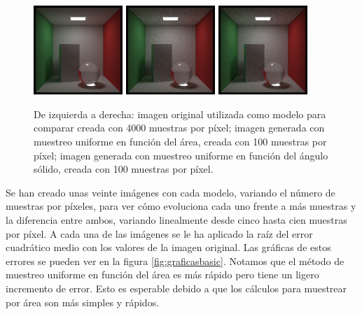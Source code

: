 \documentclass{scrbook}
\begin{document}
\begin{figure}[ht]
	\centering
	\includegraphics[width=0.3\textwidth]{original}
	\includegraphics[width=0.3\textwidth]{area_20}
	\includegraphics[width=0.3\textwidth]{solidangle2_20}
	
	\caption{De izquierda a derecha: imagen original utilizada como modelo para comparar creada con 4000 muestras por píxel; imagen generada con muestreo uniforme en función del área, creada con 100 muestras por píxel; imagen generada con muestreo uniforme en función del ángulo sólido,  creada con 100 muestras por píxel.}
	\label{fig:cornell}
\end{figure}

Se han creado unas veinte imágenes con cada modelo, variando el número de muestras por píxeles, para ver cómo evoluciona cada uno frente a más muestras y la diferencia entre ambos, variando linealmente desde cinco hasta cien muestras por píxel. A cada una de las imágenes se le ha aplicado la raíz del error cuadrático medio con los valores de la imagen original. Las gráficas de estos errores se pueden ver en la figura \ref{fig:graficasbasic}. Notamos que el método de muestreo uniforme en función del área es más rápido pero tiene un ligero incremento de error. Esto es esperable debido a que los cálculos para muestrear por área son más simples y rápidos.
\end{document}
